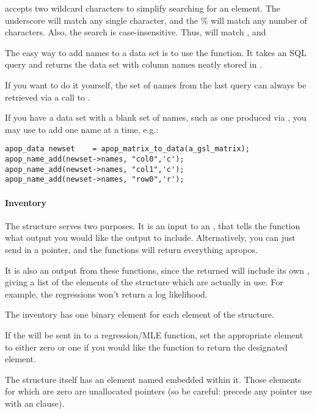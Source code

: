  accepts two wildcard characters to simplify
searching for an element. The underscore will match any single
character, and the \% will match any number of characters. Also, the
search is case-insensitive. Thus,  will match
,  and 

The easy way to add names to a data set is to use the 
 function. It takes an SQL query and returns
the data set with column names neatly stored in
.

If you want to do it yourself, the set of names from the last query can
always be retrieved via a call to .

If you have a data set with a blank set of names, such as one
produced via ,
you may use  to add one name at a
time, e.g.:
\begin{lstlisting}
apop_data newset    = apop_matrix_to_data(a_gsl_matrix);
apop_name_add(newset->names, "col0",'c');
apop_name_add(newset->names, "col1",'c');
apop_name_add(newset->names, "row0",'r');
\end{lstlisting}

\paragraph{Inventory}
The  structure serves two purposes. It is an input
to an , that tells the function what output you
would like the  output to include.  Alternatively, you
can just send in a  pointer, and the functions will return
everything apropos.

It is also an output from these functions, since the returned  will include its own ,
giving a list of the elements of the structure which are
actually in use. For example, the regressions won't return a log
likelihood.

The inventory has one binary element for each element of the  structure.

If the  will be sent in to a regression/MLE
function, set the appropriate element to either zero or one if you would
like the function to return the designated  element.

The  structure itself has an 
element named  embedded within it. Those elements for
which  are zero are unallocated pointers (so be careful:
precede any pointer use with an  clause).


